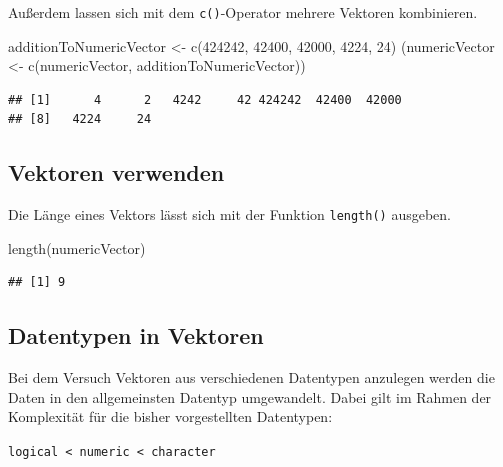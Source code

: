 \documentclass[
]{book}
\newenvironment{Shaded}{\begin{snugshade}}{\end{snugshade}}
\newcommand{\DecValTok}[1]{\textcolor[rgb]{0.00,0.00,0.81}{#1}}
\newcommand{\FunctionTok}[1]{\textcolor[rgb]{0.00,0.00,0.00}{#1}}
\newcommand{\NormalTok}[1]{#1}
\newcommand{\OtherTok}[1]{\textcolor[rgb]{0.56,0.35,0.01}{#1}}
\begin{document}
Außerdem lassen sich mit dem \texttt{c()}-Operator mehrere Vektoren kombinieren.

\begin{Shaded}
\begin{Highlighting}[]
\NormalTok{additionToNumericVector }\OtherTok{\textless{}{-}}  \FunctionTok{c}\NormalTok{(}\DecValTok{424242}\NormalTok{, }\DecValTok{42400}\NormalTok{, }\DecValTok{42000}\NormalTok{,}
                               \DecValTok{4224}\NormalTok{, }\DecValTok{24}\NormalTok{)}
\NormalTok{(numericVector }\OtherTok{\textless{}{-}} \FunctionTok{c}\NormalTok{(numericVector, }
\NormalTok{                    additionToNumericVector))}
\end{Highlighting}
\end{Shaded}

\begin{verbatim}
## [1]      4      2   4242     42 424242  42400  42000
## [8]   4224     24
\end{verbatim}

\hypertarget{vektoren-verwenden}{%
\subsection{Vektoren verwenden}\label{vektoren-verwenden}}

Die Länge eines Vektors lässt sich mit der Funktion \texttt{length()} ausgeben.

\begin{Shaded}
\begin{Highlighting}[]
\FunctionTok{length}\NormalTok{(numericVector)}
\end{Highlighting}
\end{Shaded}

\begin{verbatim}
## [1] 9
\end{verbatim}

\hypertarget{datentypen-in-vektoren}{%
\subsection{Datentypen in Vektoren}\label{datentypen-in-vektoren}}

Bei dem Versuch Vektoren aus verschiedenen Datentypen anzulegen werden die Daten in den allgemeinsten Datentyp umgewandelt. Dabei gilt im Rahmen der Komplexität für die bisher vorgestellten Datentypen:

\texttt{logical\ \textless{}\ numeric\ \textless{}\ character}
\end{document}
